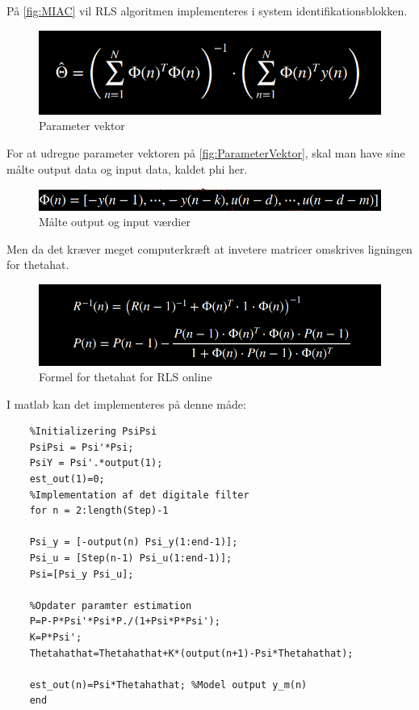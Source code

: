 På \autoref{fig:MIAC} vil RLS algoritmen implementeres i system identifikationsblokken.

\begin{figure}[H]
	\centering
	\includegraphics[width = 400pt]{Img/ParameterVektor.png}
	\caption{Parameter vektor}
	\label{fig:ParameterVektor}
\end{figure}
 For at udregne parameter vektoren på \autoref{fig:ParameterVektor}, skal man have sine målte output data og input data, kaldet phi her.
 
 \begin{figure}[H]
 	\centering
 	\includegraphics[width = 400pt]{Img/InputOutput.png}
 	\caption{Målte output og input værdier}
 	\label{fig:InputOutput}
 \end{figure}
 Men da det kræver meget computerkræft at invetere matricer omskrives ligningen for thetahat.
 
  \begin{figure}[H]
 	\centering
 	\includegraphics[width = 400pt]{Img/P_rls.png}
 	\caption{Formel for thetahat for RLS online}
 	\label{fig:P_rls}
 \end{figure}
 
 I matlab kan det implementeres på denne måde:
 
 \begin{lstlisting}
 	%Initializering PsiPsi
 	PsiPsi = Psi'*Psi;
 	PsiY = Psi'.*output(1);
 	est_out(1)=0;
 	%Implementation af det digitale filter
 	for n = 2:length(Step)-1
 	
 	Psi_y = [-output(n) Psi_y(1:end-1)];
 	Psi_u = [Step(n-1) Psi_u(1:end-1)];
 	Psi=[Psi_y Psi_u];
 	
 	%Opdater paramter estimation
 	P=P-P*Psi'*Psi*P./(1+Psi*P*Psi');
 	K=P*Psi';
 	Thetahathat=Thetahathat+K*(output(n+1)-Psi*Thetahathat);
 	
 	est_out(n)=Psi*Thetahathat; %Model output y_m(n)
 	end
 \end{lstlisting}